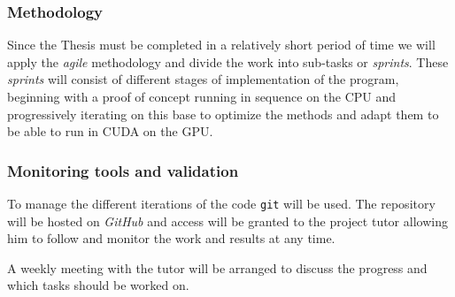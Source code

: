 
\subsubsection{Methodology}

Since the Thesis must be completed in a relatively short period of time we will
apply the \emph{agile} methodology and divide the work into sub-tasks or
\emph{sprints}. These \emph{sprints} will consist of different stages of
implementation of the program, beginning with a proof of concept running in
sequence on the CPU and progressively iterating on this base to optimize the
methods and adapt them to be able to run in CUDA on the GPU.

\subsubsection{Monitoring tools and validation}

To manage the different iterations of the code \texttt{git} will be used. The
repository will be hosted on \emph{GitHub} and access will be granted to the
project tutor allowing him to follow and monitor the work and results at any
time.

A weekly meeting with the tutor will be arranged to discuss the progress and
which tasks should be worked on.
